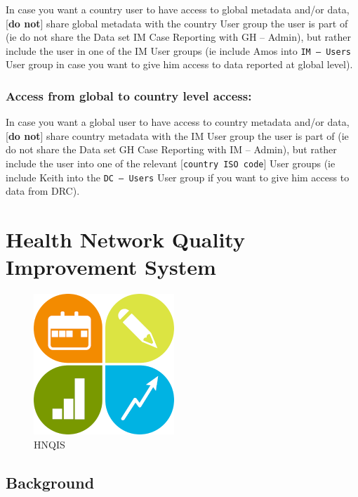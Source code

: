 \documentclass[]{book}
\begin{document}
In case you want a country user to have access to global metadata and/or data, {[}\textbf{do not}{]} share global metadata with the country User group the user is part of (ie do not share the Data set IM Case Reporting with GH -- Admin), but rather include the user in one of the IM User groups (ie include Amos into \texttt{IM\ –\ Users} User group in case you want to give him access to data reported at global level).

\hypertarget{access-from-global-to-country-level-access}{%
\subsection{Access from global to country level access:}\label{access-from-global-to-country-level-access}}

In case you want a global user to have access to country metadata and/or data, {[}\textbf{do not}{]} share country metadata with the IM User group the user is part of (ie do not share the Data set GH Case Reporting with IM -- Admin), but rather include the user into one of the relevant {[}\texttt{country\ ISO\ code}{]} User groups (ie include Keith into the \texttt{DC\ –\ Users} User group if you want to give him access to data from DRC).

\hypertarget{hnqis}{%
\chapter{Health Network Quality Improvement System}\label{hnqis}}

\begin{figure}
\centering
\includegraphics{images/hnqis.png}
\caption{HNQIS}
\end{figure}

\hypertarget{background-1}{%
\section{Background}\label{background-1}}
\end{document}
